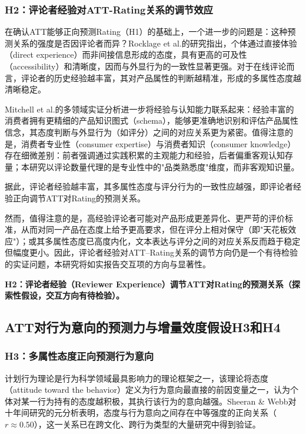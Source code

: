 \subsubsection{H2：评论者经验对ATT-Rating关系的调节效应}

在确认ATT能够正向预测Rating（H1）的基础上，一个进一步的问题是：这种预测关系的强度是否因评论者而异？Rocklage et al.\cite{rocklage2023}的研究指出，个体通过直接体验（direct experience）而非间接信息形成的态度，具有更高的可及性（accessibility）和清晰度，因而与外显行为的一致性显著更强。对于在线评论而言，评论者的历史经验越丰富，其对产品属性的判断越精准，形成的多属性态度越清晰稳定。

Mitchell et al.\cite{mitchell2022}的多领域实证分析进一步将经验与认知能力联系起来：经验丰富的消费者拥有更精细的产品知识图式（schema），能够更准确地识别和评估产品属性信念，其态度判断与外显行为（如评分）之间的对应关系更为紧密。值得注意的是，消费者专业性（consumer expertise）与消费者知识（consumer knowledge）存在细微差别：前者强调通过实践积累的主观能力和经验，后者偏重客观认知存量；本研究以评论数量代理的是专业性中的"品类熟悉度"维度，而非客观知识量。

据此，评论者经验越丰富，其多属性态度与评分行为的一致性应越强，即评论者经验正向调节ATT对Rating的预测关系。

然而，值得注意的是，高经验评论者可能对产品形成更差异化、更严苛的评价标准，从而对同一产品在态度上给予更高要求，但在评分上相对保守（即"天花板效应"）；或其多属性态度已高度内化，文本表达与评分之间的对应关系反而趋于稳定但幅度更小。因此，评论者经验对ATT--Rating关系的调节方向仍是一个有待检验的实证问题，本研究将如实报告交互项的方向与显著性。

\textbf{H2：评论者经验（Reviewer Experience）调节ATT对Rating的预测关系（探索性假设，交互方向有待检验）。}

\subsection{ATT对行为意向的预测力与增量效度假设H3和H4}

\subsubsection{H3：多属性态度正向预测行为意向}

计划行为理论\cite{ajzen1991}是行为科学领域最具影响力的理论框架之一，该理论将态度（attitude toward the behavior）定义为行为意向最直接的前因变量之一，认为个体对某一行为持有的态度越积极，其执行该行为的意向越强。Sheeran \& Webb\cite{sheeran2022}对十年间研究的元分析表明，态度与行为意向之间存在中等强度的正向关系（$r \approx 0.50$），这一关系已在跨文化、跨行为类型的大量研究中得到验证。

